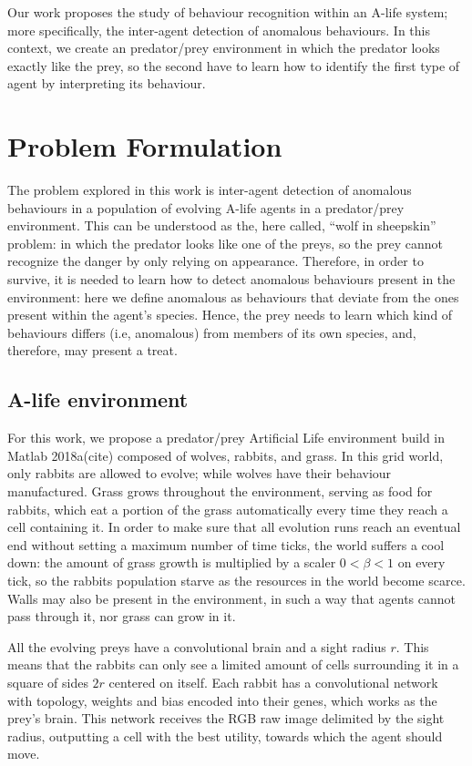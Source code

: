 \documentclass[letterpaper]{article}
\numberwithin{equation}{section}
\numberwithin{theorem}{section}
\numberwithin{lemma}{section}
\numberwithin{df}{section}
\begin{document}
Our work proposes the study of behaviour recognition within an A-life system; more specifically, the inter-agent detection of anomalous behaviours. In this context, we create an predator/prey environment in which the predator looks exactly like the prey, so the second have to learn how to identify the first type of agent by interpreting its behaviour. 

\section{Problem Formulation}

The problem explored in this work is inter-agent detection of anomalous behaviours in a population of evolving A-life agents in a predator/prey environment. This can be understood as the, here called, ``wolf in sheepskin'' problem: in which the predator looks like one of the preys, so the prey cannot recognize the danger by only relying on appearance. Therefore, in order to survive, it is needed to learn how to detect anomalous behaviours present in the environment: here we define anomalous as behaviours that deviate from the ones present within the agent's species. Hence, the prey needs to learn which kind of behaviours differs (i.e, anomalous) from members of its own species, and, therefore, may present a treat.

\subsection{A-life environment}

For this work, we propose a predator/prey Artificial Life environment build in Matlab 2018a(cite) composed of wolves, rabbits, and grass. In this grid world, only rabbits are allowed to evolve; while wolves have their behaviour manufactured. Grass grows throughout the environment, serving as food for rabbits, which eat a portion of the grass automatically every time they reach a cell containing it. In order to make sure that all evolution runs reach an eventual end without setting a maximum number of time ticks, the world suffers a cool down: the amount of grass growth is multiplied by a scaler $0 < \beta < 1$ on every tick, so the rabbits population starve as the resources in the world become scarce. Walls may also be present in the environment, in such a way that agents cannot pass through it, nor grass can grow in it.

All the evolving preys have a convolutional brain and a sight radius $r$. This means that the rabbits can only see a limited amount of cells surrounding it in a square of sides $2r$ centered on itself. Each rabbit has a convolutional network with topology, weights and bias encoded into their genes, which works as the prey's brain. This network receives the RGB raw image delimited by the sight radius, outputting a cell with the best utility, towards which the agent should move.
\end{document}
